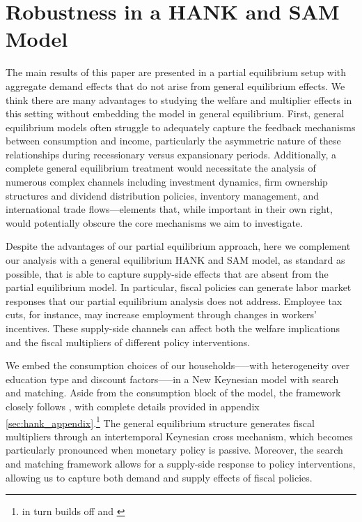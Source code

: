 \documentclass[\econtexRoot/HAFiscal]{subfiles}
\begin{document}
	
\FloatBarrier
\hypertarget{hank}{}\par\section{Robustness in a HANK and SAM Model}
\notinsubfile{\label{sec:hank}}


The main results of this paper are presented in a partial equilibrium setup with aggregate demand effects that do not arise from general equilibrium effects. We think there are many advantages to studying the welfare and multiplier effects in this setting without embedding the model in general equilibrium.  First, general equilibrium models often struggle to adequately capture the feedback mechanisms between consumption and income, particularly the asymmetric nature of these relationships during recessionary versus expansionary periods. Additionally, a complete general equilibrium treatment would necessitate the analysis of numerous complex channels including investment dynamics, firm ownership structures and dividend distribution policies, inventory management, and international trade flows—elements that, while important in their own right, would potentially obscure the core mechanisms we aim to investigate.



Despite the advantages of our partial equilibrium approach, here we complement our analysis with a  general equilibrium HANK and SAM model, as standard as possible, that is able to capture supply-side effects that are absent from the partial equilibrium model. In particular, fiscal policies can generate labor market responses that our partial equilibrium analysis does not address. Employee tax cuts, for instance, may increase employment through changes in workers' incentives. These supply-side channels can affect both the welfare implications and the fiscal multipliers of different policy interventions.



We embed the consumption choices of our households—--with heterogeneity over education type and discount factors—--in a New Keynesian model with search and matching. Aside from the consumption block of the model, the framework closely follows \cite{Du2024}, with complete details provided in appendix \ref{sec:hank_appendix}.\footnote{\cite{Du2024} in turn builds off \cite{Gornemann2021} and \cite{Auclert2020}} The general equilibrium structure generates fiscal multipliers through an intertemporal Keynesian cross mechanism, which becomes particularly pronounced when monetary policy is passive. Moreover, the search and matching framework allows for a supply-side response to policy interventions, allowing us to capture both demand and supply effects of fiscal policies.
\end{document}
